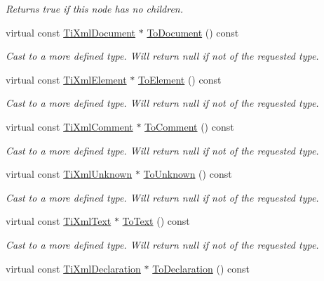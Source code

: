 \begin{DoxyCompactItemize}
\begin{DoxyCompactList}\small\item\em Returns true if this node has no children. \end{DoxyCompactList}\item 
virtual const \hyperlink{class_ti_xml_document}{Ti\-Xml\-Document} $\ast$ \hyperlink{class_ti_xml_node_a8a4cda4b15c29f64cff419309aebed08}{To\-Document} () const 
\begin{DoxyCompactList}\small\item\em Cast to a more defined type. Will return null if not of the requested type. \end{DoxyCompactList}\item 
virtual const \hyperlink{class_ti_xml_element}{Ti\-Xml\-Element} $\ast$ \hyperlink{class_ti_xml_node_a72abed96dc9667ab9e0a2a275301bb1c}{To\-Element} () const 
\begin{DoxyCompactList}\small\item\em Cast to a more defined type. Will return null if not of the requested type. \end{DoxyCompactList}\item 
virtual const \hyperlink{class_ti_xml_comment}{Ti\-Xml\-Comment} $\ast$ \hyperlink{class_ti_xml_node_aa0a5086f9eaee910bbfdc7f975e26574}{To\-Comment} () const 
\begin{DoxyCompactList}\small\item\em Cast to a more defined type. Will return null if not of the requested type. \end{DoxyCompactList}\item 
virtual const \hyperlink{class_ti_xml_unknown}{Ti\-Xml\-Unknown} $\ast$ \hyperlink{class_ti_xml_node_afd7205cf31d7a376929f8a36930627a2}{To\-Unknown} () const 
\begin{DoxyCompactList}\small\item\em Cast to a more defined type. Will return null if not of the requested type. \end{DoxyCompactList}\item 
virtual const \hyperlink{class_ti_xml_text}{Ti\-Xml\-Text} $\ast$ \hyperlink{class_ti_xml_node_a95a46a52c525992d6b4ee08beb14cd69}{To\-Text} () const 
\begin{DoxyCompactList}\small\item\em Cast to a more defined type. Will return null if not of the requested type. \end{DoxyCompactList}\item 
virtual const \hyperlink{class_ti_xml_declaration}{Ti\-Xml\-Declaration} $\ast$ \hyperlink{class_ti_xml_node_a9f43e6984fc7d4afd6eb32714c6b7b72}{To\-Declaration} () const 

\end{DoxyCompactItemize}
